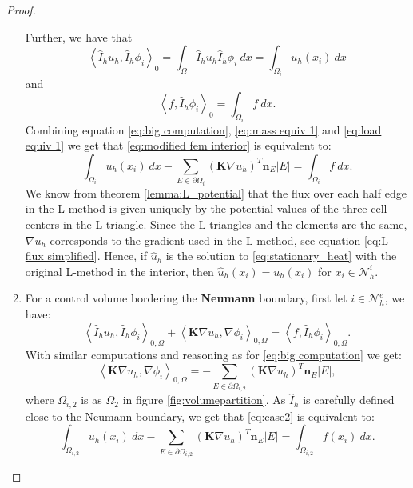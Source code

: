 \documentclass[../Main/main.tex]{subfiles}
\begin{document}
\begin{proof}
\begin{enumerate}
			Further, we have that 
			\begin{equation}\label{eq:mass equiv 1}
				\left \langle \hat{I}_h  u_h,\hat{I}_h\phi_i \right \rangle_0 = \int_{\Omega}\hat{I}_h u_h \hat{I}_h \phi_i \ dx =  \int_{\Omega_i}u_h(x_i) \ dx
			\end{equation}
			and
			\begin{equation}\label{eq:load equiv 1}
				\left \langle f,\hat{I}_h \phi_i \right \rangle_0 = \int_{\Omega_i}f \ dx.
			\end{equation}
			Combining equation \eqref{eq:big computation}, \eqref{eq:mass equiv 1} and \eqref{eq:load equiv 1} we get that \eqref{eq:modified fem interior} is equivalent to:
			\begin{equation}
				\int_{\Omega_i}u_h(x_i) \ dx - \sum_{E\in \partial \Omega_i} (\pmb{K}\nabla u_h)^T\bm{n}_E |E| = \int_{\Omega_i}f \ dx.
			\end{equation}
			We know from theorem \ref{lemma:L_potential} that the flux over each half edge in the L-method is given uniquely by the potential values of the three cell centers in the L-triangle. Since the L-triangles and the elements are the same, $\nabla u_h$ corresponds to the gradient used in the L-method, see equation \eqref{eq:L flux simplified}. Hence, if $\hat{u}_h$ is the solution to \eqref{eq:stationary_heat} with the original L-method in the interior, then $\hat{u}_h(x_i)=u_h(x_i)$ for $x_i\in \mathcal{N}^i_h$. 
			\item For a control volume bordering the \textbf{Neumann} boundary, first let $i\in \mathcal{N}_h^e$, we have:
			\begin{equation}\label{eq:case2}
				\left \langle \hat{I}_h u_h,\hat{I}_h \phi_i \right \rangle_{0,\Omega} +   \left \langle\bm{K} \nabla u_h,\nabla \phi_i \right \rangle_{0,\Omega} = \left \langle f,\hat{I}_h \phi_i \right \rangle_{0,\Omega}.
			\end{equation}
			With similar computations and reasoning as for \eqref{eq:big computation} we get:
			\begin{equation}
					\left \langle\bm{K} \nabla u_h,\nabla \phi_i \right \rangle_{0,\Omega}= 
					- \sum_{E\in \partial \Omega_{i,2}} (\pmb{K}\nabla u_h)^T\bm{n}_E |E|, 
			\end{equation}
			where $\Omega_{i,2}$ is as $\Omega_2$ in figure \ref{fig:volumepartition}. As $\hat{I}_h$ is carefully defined close to the Neumann boundary, we get that \eqref{eq:case2} is equivalent to:
			\begin{equation}\label{eq:FVML neumann cell}	\int_{\Omega_{i,2}}u_h(x_i) \ dx - \sum_{E\in \partial \Omega_{i,2}} (\pmb{K}\nabla u_h)^T\bm{n}_E |E| = \int_{\Omega_{i,2}}f(x_i) \ dx.

\end{equation}
\end{enumerate}
\end{proof}
\end{document}
